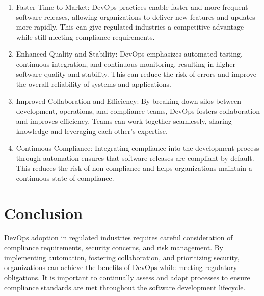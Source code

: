 \begin{enumerate}
    \item Faster Time to Market: DevOps practices enable faster and more frequent software releases, allowing organizations to deliver new features and updates more rapidly. This can give regulated industries a competitive advantage while still meeting compliance requirements.

    \item Enhanced Quality and Stability: DevOps emphasizes automated testing, continuous integration, and continuous monitoring, resulting in higher software quality and stability. This can reduce the risk of errors and improve the overall reliability of systems and applications.

    \item Improved Collaboration and Efficiency: By breaking down silos between development, operations, and compliance teams, DevOps fosters collaboration and improves efficiency. Teams can work together seamlessly, sharing knowledge and leveraging each other's expertise.

    \item Continuous Compliance: Integrating compliance into the development process through automation ensures that software releases are compliant by default. This reduces the risk of non-compliance and helps organizations maintain a continuous state of compliance.
\end{enumerate}

\section*{Conclusion}

DevOps adoption in regulated industries requires careful consideration of compliance requirements, security concerns, and risk management. By implementing automation, fostering collaboration, and prioritizing security, organizations can achieve the benefits of DevOps while meeting regulatory obligations. It is important to continually assess and adapt processes to ensure compliance standards are met throughout the software development lifecycle.